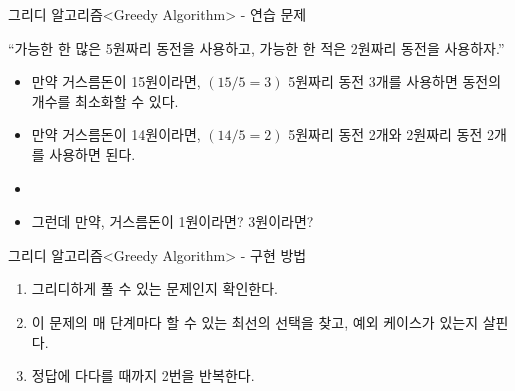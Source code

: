 \begin{frame}{그리디 알고리즘}{<Greedy Algorithm> - 연습 문제}
  \begin{center}
  \end{center}
  \vspace{6mm}
  ``가능한 한 많은 5원짜리 동전을 사용하고, 가능한 한 적은 2원짜리 동전을 사용하자.''
  \vspace{2mm}
  \begin{itemize}
    \item 만약 거스름돈이 15원이라면, $(15 / 5 = 3)$ 5원짜리 동전 3개를 사용하면
      동전의 개수를 최소화할 수 있다.
    \item 만약 거스름돈이 14원이라면, $(14 / 5 = 2)$ 5원짜리 동전 2개와 2원짜리 동전 2개를
      사용하면 된다.
    \item[] \vspace{1mm}
    \item 그런데 만약, \alert{거스름돈이 1원이라면? 3원이라면?}
  \end{itemize}
\end{frame}

\begin{frame}{그리디 알고리즘}{<Greedy Algorithm> - 구현 방법}
  \begin{enumerate}
    \item 그리디하게 풀 수 있는 문제인지 확인한다.
    \item 이 문제의 매 단계마다 할 수 있는 최선의 선택을 찾고, 예외 케이스가 있는지 살핀다.
    \item 정답에 다다를 때까지 2번을 반복한다.
  \end{enumerate}
\end{frame}


